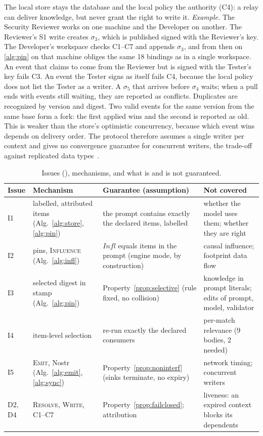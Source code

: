 \documentclass[10pt,conference]{IEEEtran}
\theoremstyle{definition}
\newcommand{\Infl}{\mathit{Infl}}
\begin{document}
The local store stays the database and the local policy the authority (C4): a relay can deliver knowledge, but
never grant the right to write it. \emph{Example.} The Security Reviewer works on one machine and the Developer
on another. The Reviewer's S1 write creates $\sigma_3$, which is published signed with the Reviewer's key. The
Developer's workspace checks C1--C7 and appends $\sigma_3$, and from then on \cref{alg:pin} on that machine
obliges the same 18 bindings as in a single workspace. An event that claims to come from the Reviewer but is
signed with the Tester's key fails C3. An event the Tester signs as itself fails C4, because the local policy
does not list the Tester as a writer. A $\sigma_5$ that arrives before $\sigma_4$ waits; when a pull ends with
events still waiting, they are reported as conflicts. Duplicates are recognized by version and digest. Two
valid events for the same version from the same base form a fork: the first applied wins and the second is
reported as old. This is weaker than the store's optimistic concurrency, because which event wins depends on
delivery order. The protocol therefore assumes a single writer per context and gives no convergence guarantee
for concurrent writers, the trade-off against replicated data types~\cite{shapiro2011crdt}.

\begin{table}[t]
\centering
\caption{Issues (), mechanisms, and what is and is not guaranteed.}
\label{tab:guarantees}
\scriptsize
\setlength{\tabcolsep}{2pt}
\begin{tabular}{@{}>{\raggedright}p{7mm}>{\raggedright}p{19mm}>{\raggedright}p{26mm}>{\raggedright\arraybackslash}p{28mm}@{}}
\toprule
Issue & Mechanism & Guarantee (assumption) & Not covered \\
\midrule
I1 & labelled, attributed items (Alg.~\ref{alg:store}, \ref{alg:pin}) & the prompt contains exactly the declared
  items, labelled & whether the model uses them; whether they are right \\
I2 & pins, \textsc{Influence} (Alg.~\ref{alg:infl}) & $\Infl$ equals items in the prompt (engine mode, by
  construction) & causal influence; footprint data flow \\
I3 & selected digest in stamp (Alg.~\ref{alg:pin}) & Property~\ref{prop:selective} (rule fixed, no collision) &
  knowledge in prompt literals; edits of prompt, model, validator \\
I4 & item-level selection & re-run exactly the declared consumers & per-match relevance (9 bodies, 2 needed) \\
I5 & \textsc{Emit}, Nostr (Alg.~\ref{alg:emit}, \ref{alg:sync}) & Property~\ref{prop:noninterf} (sinks terminate,
  no expiry) & network timing; concurrent writers \\
D2, D4 & \textsc{Resolve}, \textsc{Write}, C1--C7 & Property~\ref{prop:failclosed}; attribution & liveness: an
  expired context blocks its dependents \\
\bottomrule
\end{tabular}
\end{table}
\end{document}
